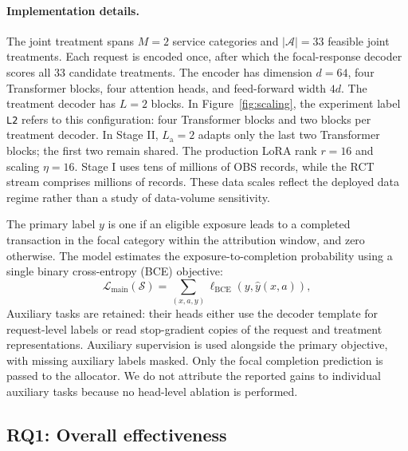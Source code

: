 \documentclass[sigconf,nonacm]{acmart}
\begin{document}
\paragraph{Implementation details.}
The joint treatment spans $M=2$ service categories and
$|\mathcal A|=33$ feasible joint treatments. Each request is encoded once,
after which the focal-response decoder scores all 33 candidate treatments.
The encoder has dimension $d=64$, four Transformer blocks, four attention
heads, and feed-forward width $4d$. The treatment decoder has $L=2$ blocks.
In Figure~\ref{fig:scaling}, the experiment label \texttt{L2} refers to this
configuration: four Transformer blocks and two blocks per treatment decoder.
In Stage II, $L_{\mathrm a}=2$ adapts only the last two Transformer blocks; the
first two remain shared. The production LoRA rank
$r=16$ and scaling $\eta=16$. Stage I uses tens of millions of OBS records, while the RCT stream comprises millions of records.
These data scales reflect the deployed data regime rather than a
study of data-volume sensitivity.

The primary label $y$ is one if an eligible exposure leads to a completed
transaction in the focal category within the attribution window, and zero otherwise.
The model estimates the exposure-to-completion probability using a single
binary cross-entropy (BCE) objective:
\begin{equation}
\label{eq:primary-loss}
\mathcal L_{\mathrm{main}}(\mathcal S)
=
\sum_{(x,a,y)}
\ell_{\mathrm{BCE}}\!\left(y,\hat y(x,a)\right),
\end{equation} 
Auxiliary tasks are retained: their heads either use the decoder template
for request-level labels or read stop-gradient copies of the request and
treatment representations. Auxiliary supervision is used alongside the
primary objective, with missing auxiliary labels masked. Only the focal
completion prediction is passed to the allocator. We do not attribute the
reported gains to individual auxiliary tasks because no head-level ablation
is performed.

\subsection{RQ1: Overall effectiveness}
\end{document}
